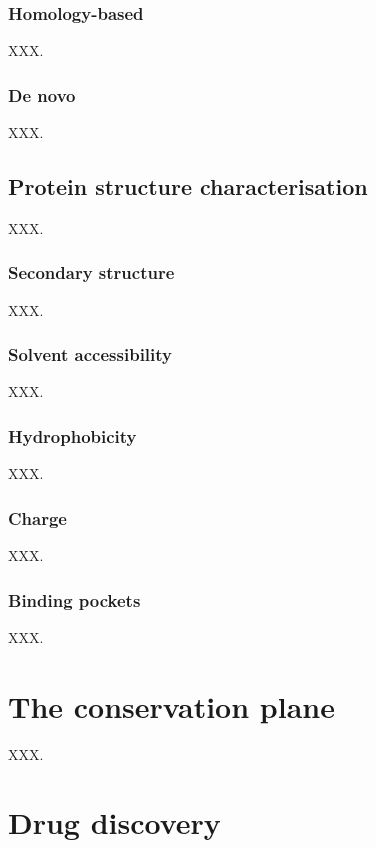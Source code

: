 \subsubsection{Homology-based}

XXX.

\subsubsection{De novo}

XXX.

\subsection{Protein structure characterisation}

XXX.

\subsubsection{Secondary structure}

XXX.

\subsubsection{Solvent accessibility}

XXX.

\subsubsection{Hydrophobicity}

XXX.

\subsubsection{Charge}

XXX.

\subsubsection{Binding pockets}

XXX.

\section{The conservation plane}

XXX.

\section{Drug discovery}

